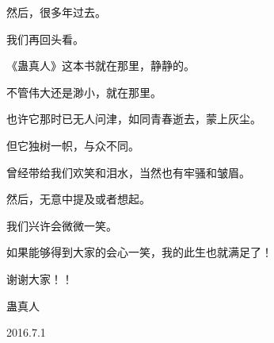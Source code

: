 \begin{this_body}
然后，很多年过去。

我们再回头看。

《蛊真人》这本书就在那里，静静的。

不管伟大还是渺小，就在那里。

也许它那时已无人问津，如同青春逝去，蒙上灰尘。

但它独树一帜，与众不同。

曾经带给我们欢笑和泪水，当然也有牢骚和皱眉。

然后，无意中提及或者想起。

我们兴许会微微一笑。

如果能够得到大家的会心一笑，我的此生也就满足了！

谢谢大家！！

蛊真人

2016.7.1

\end{this_body}

